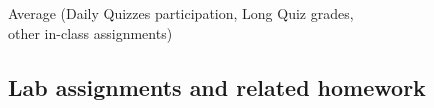 \documentclass[12pt]{scrartcl}
\begin{document}

\begin{tcolorbox}[colback=blue!5,colframe=blue!75!black,title=HW / Quizzes / In-Class Assignments Grade (HW/Q/IC)]
\begin{center}
Average (Daily Quizzes participation, Long Quiz grades, \\ other in-class assignments)\\
\end{center}
\end{tcolorbox}

\subsection{Lab assignments and related homework}
\end{document}
